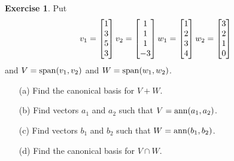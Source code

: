 \documentclass[a4paper]{amsart}
\theoremstyle{definition}
\newtheorem{exercise}{Exercise}
\begin{document}
\begin{exercise}\label{ex-plus-cap-i}
 Put 
 \[ v_1 = \left[\begin{matrix} 1 \\ 3 \\ 5 \\ 3 \end{matrix}\right] 
    v_2 = \left[\begin{matrix} 1 \\ 1 \\ 1 \\ -3 \end{matrix}\right] 
    w_1 = \left[\begin{matrix} 1 \\ 2 \\ 3 \\ 4 \end{matrix}\right]
    w_2 = \left[\begin{matrix} 3 \\ 2 \\ 1 \\ 0 \end{matrix}\right]
 \]
 and $V=\operatorname{span}(v_1,v_2)$ and $W=\operatorname{span}(w_1,w_2)$.
 \begin{itemize}
  \item[(a)] Find the canonical basis for $V+W$.
  \item[(b)] Find vectors $a_1$ and $a_2$ such that
   $V=\operatorname{ann}(a_1,a_2)$. 
  \item[(c)] Find vectors $b_1$ and $b_2$ such that
   $W=\operatorname{ann}(b_1,b_2)$. 
  \item[(d)] Find the canonical basis for $V\cap W$.
 \end{itemize}
\end{exercise}
\end{document}
